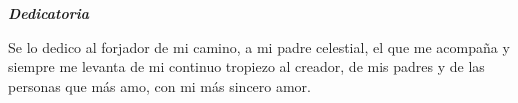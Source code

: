 \newpage\vspace*{0.4\textheight}
\begin{flushright}\em
	\textbf{Dedicatoria}\par
	Se lo dedico al forjador de mi camino, a mi padre celestial, el que
	me acompaña y siempre me levanta de mi continuo tropiezo al
	creador, de mis padres y de las personas que más amo, con mi más
	sincero amor.
\end{flushright}
